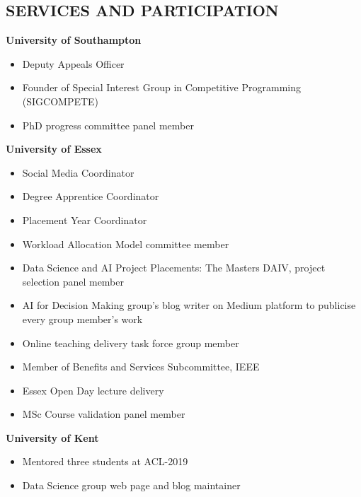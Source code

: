 \documentclass[margin]{res}
\begin{document}
\begin{resume}
\section{SERVICES AND PARTICIPATION}
\textbf{University of Southampton}
\begin{itemize}\itemsep -10pt
    \item Deputy Appeals Officer \\
    \item Founder of Special Interest Group in Competitive Programming (SIGCOMPETE)\\
    \item PhD progress committee panel member
\end{itemize}
\textbf{University of Essex}
\begin{itemize}\itemsep -10pt
    \item Social Media Coordinator \\
    \item Degree Apprentice Coordinator \\
    \item Placement Year Coordinator \\
    \item Workload Allocation Model committee member \\
    \item Data Science and AI Project Placements: The Masters DAIV, project selection panel member \\
    \item AI for Decision Making group’s blog writer on Medium platform to publicise every group member's work \\
    \item Online teaching delivery task force group member \\
    \item Member of Benefits and Services Subcommittee, IEEE \\
    \item Essex Open Day lecture delivery \\
    \item MSc Course validation panel member
\end{itemize}
\textbf{University of Kent}
\begin{itemize}\itemsep -10pt
\item Mentored three students at ACL-2019 \\
\item Data Science group web page and blog maintainer\\

\end{itemize}
\end{resume}
\end{document}
